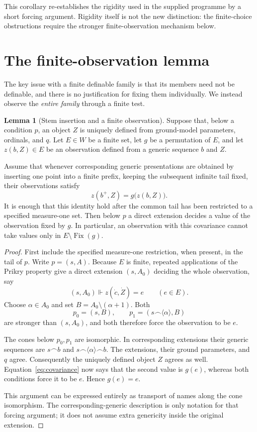 \documentclass[11pt,letterpaper]{article}
\theoremstyle{definition}
\newtheorem{lemma}[definition]{Lemma}
\numberwithin{equation}{section}
\newcommand{\cat}{\mathbin{\smallfrown}}
\newcommand{\fix}{\operatorname{Fix}}
\begin{document}
This corollary re-establishes the rigidity used in the supplied programme by a short forcing argument. Rigidity itself is not the new distinction: the finite-choice obstructions require the stronger finite-observation mechanism below.

\section{The finite-observation lemma}\label{sec:observation}

The key issue with a finite definable family is that its members need not be definable, and there is no justification for fixing them individually. We instead observe the \emph{entire family} through a finite test.

\begin{lemma}[Stem insertion and a finite observation]\label{lem:observation}
Suppose that, below a condition $p$, an object $Z$ is uniquely defined from ground-model parameters, ordinals, and $q$. Let $E\in W$ be a finite set, let $g$ be a permutation of $E$, and let $z(b,Z)\in E$ be an observation defined from a generic sequence $b$ and $Z$.

Assume that whenever corresponding generic presentations are obtained by inserting one point into a finite prefix, keeping the subsequent infinite tail fixed, their observations satisfy
\begin{equation}\label{eq:covariance}
z(b^+,Z)=g\bigl(z(b,Z)\bigr).
\end{equation}
It is enough that this identity hold after the common tail has been restricted to a specified measure-one set. Then below $p$ a direct extension decides a value of the observation fixed by $g$. In particular, an observation with this covariance cannot take values only in $E\setminus\fix(g)$.
\end{lemma}
\begin{proof}
First include the specified measure-one restriction, when present, in the tail of $p$. Write $p=(s,A)$. Because $E$ is finite, repeated applications of the Prikry property give a direct extension $(s,A_0)$ deciding the whole observation, say
\[
(s,A_0)\Vdash z(\dot c,\dot Z)=e\qquad(e\in E).
\]
Choose $\alpha\in A_0$ and set $B=A_0\setminus(\alpha+1)$. Both
\[
p_0=(s,B),\qquad p_1=(s\cat\langle\alpha\rangle,B)
\]
are stronger than $(s,A_0)$, and both therefore force the observation to be $e$.

The cones below $p_0,p_1$ are isomorphic. In corresponding extensions their generic sequences are $s\cat b$ and $s\cat\langle\alpha\rangle\cat b$. The extensions, their ground parameters, and $q$ agree. Consequently the uniquely defined object $Z$ agrees as well. Equation~\eqref{eq:covariance} now says that the second value is $g(e)$, whereas both conditions force it to be $e$. Hence $g(e)=e$.

This argument can be expressed entirely as transport of names along the cone isomorphism. The corresponding-generic description is only notation for that forcing argument; it does not assume extra genericity inside the original extension.
\end{proof}
\end{document}
